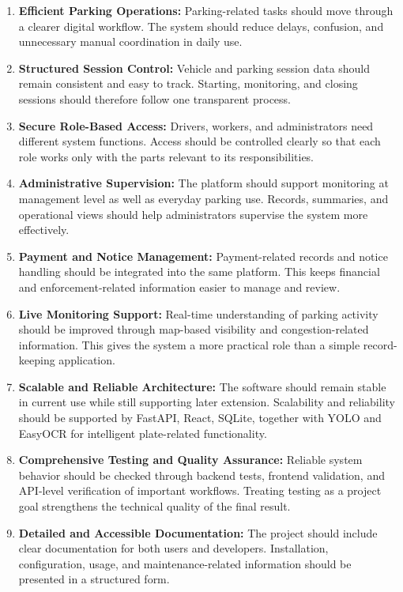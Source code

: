 \documentclass[12pt,a4paper,oneside]{report}
\begin{document}
\begin{enumerate}[leftmargin=2em,label=\arabic*.]
    \item \textbf{Efficient Parking Operations:} Parking-related tasks should move through a clearer digital workflow. The system should reduce delays, confusion, and unnecessary manual coordination in daily use.

    \item \textbf{Structured Session Control:} Vehicle and parking session data should remain consistent and easy to track. Starting, monitoring, and closing sessions should therefore follow one transparent process.

    \item \textbf{Secure Role-Based Access:} Drivers, workers, and administrators need different system functions. Access should be controlled clearly so that each role works only with the parts relevant to its responsibilities.

    \item \textbf{Administrative Supervision:} The platform should support monitoring at management level as well as everyday parking use. Records, summaries, and operational views should help administrators supervise the system more effectively.

    \item \textbf{Payment and Notice Management:} Payment-related records and notice handling should be integrated into the same platform. This keeps financial and enforcement-related information easier to manage and review.

    \item \textbf{Live Monitoring Support:} Real-time understanding of parking activity should be improved through map-based visibility and congestion-related information. This gives the system a more practical role than a simple record-keeping application.

    \item \textbf{Scalable and Reliable Architecture:} The software should remain stable in current use while still supporting later extension. Scalability and reliability should be supported by FastAPI, React, SQLite, together with YOLO and EasyOCR for intelligent plate-related functionality.

    \item \textbf{Comprehensive Testing and Quality Assurance:} Reliable system behavior should be checked through backend tests, frontend validation, and API-level verification of important workflows. Treating testing as a project goal strengthens the technical quality of the final result.

    \item \textbf{Detailed and Accessible Documentation:} The project should include clear documentation for both users and developers. Installation, configuration, usage, and maintenance-related information should be presented in a structured form.
\end{enumerate}
\end{document}
